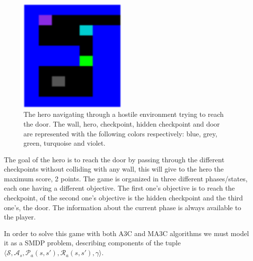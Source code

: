 \begin{figure}[hbtp]
\begin{center}
\includegraphics[width=200]{img/SimpleStates_going_up.png}
\end{center}
\caption[Simple States game]
{The hero navigating through a hostile environment trying to reach the door. The wall, hero, checkpoint, hidden checkpoint
and door are represented with the following colors respectively: blue, grey, green, turquoise and violet.}
\label{fig:SimpleStates}
\end{figure}

The goal of the hero is to reach the door by passing through the different checkpoints without colliding
with any wall, this will give to the hero the maximum score, 2 points.
The game is organized in three different phases/states, each one having a different objective.
The first one's objective is to reach the checkpoint,
of the second one's objective is the hidden checkpoint and the third one's, the door.
The information about the current phase is always available to the player.

In order to solve this game with both \ac{A3C} and \ac{MA3C} algorithms we must model it as a \ac{SMDP} problem,
describing components of the tuple $\langle\mathcal{S}, \mathcal{A}_s, \mathcal{P}_a(s,s'), \mathcal{R}_a(s,s'), \gamma \rangle$.

